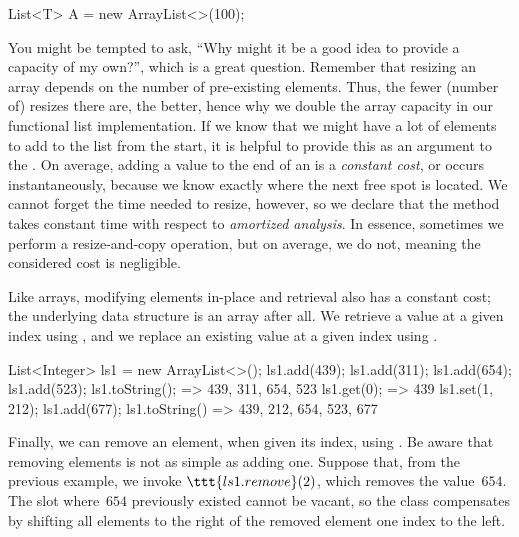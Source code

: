 \begin{verbnobox}[\small]
List<T> A = new ArrayList<>(100);
\end{verbnobox}

You might be tempted to ask, ``Why might it be a good idea to provide a capacity of my own?'', which is a great question. 
Remember that resizing an array depends on the number of pre-existing elements. 
Thus, the fewer (number of) resizes there are, the better, hence why we double the array capacity in our functional list implementation. 
If we know that we might have a lot of elements to add to the list from the start, it is helpful to provide this as an argument to the . 
On average, adding a value to the end of an  is a \emph{constant cost}, or occurs instantaneously, because we know exactly where the next free spot is located. 
We cannot forget the time needed to resize, however, so we declare that the  method takes constant time with respect to \emph{amortized analysis}. 
In essence, sometimes we perform a resize-and-copy operation, but on average, we do not, meaning the considered cost is negligible.

Like arrays, modifying elements in-place and retrieval also has a constant cost; the underlying data structure is an array after all. 
We retrieve a value at a given index using , and we replace an existing value at a given index using .


\begin{verbnobox}[\small]
List<Integer> ls1 = new ArrayList<>();
ls1.add(439);
ls1.add(311);
ls1.add(654);
ls1.add(523);
ls1.toString();  => {439, 311, 654, 523}
ls1.get(0);      => 439
ls1.set(1, 212);
ls1.add(677);
ls1.toString()   => {439, 212, 654, 523, 677}
\end{verbnobox}

Finally, we can remove an element, when given its index, using . 
Be aware that removing elements is not as simple as adding one. 
Suppose that, from the previous example, we invoke $\ttt{ls1.remove}(2)$, which removes the value~$654$. 
The slot where~$654$ previously existed cannot be vacant, so the  class compensates by shifting all elements to the right of the removed element one index to the left.

